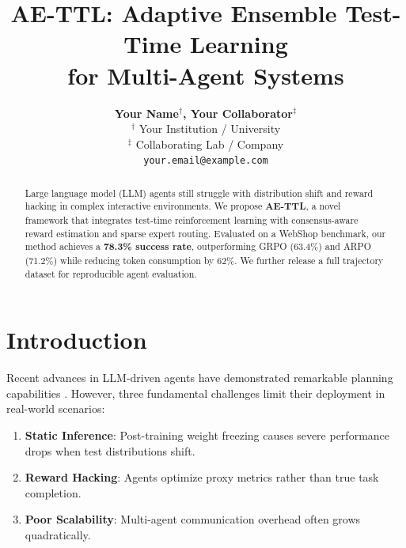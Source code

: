 \documentclass[10pt,twocolumn,letterpaper]{article}
\begin{document}
\title{\textbf{AE-TTL: Adaptive Ensemble Test-Time Learning \\ for Multi-Agent Systems}}

\author{
  \textbf{Your Name$^\dagger$, Your Collaborator$^\ddagger$} \\
  $^\dagger$ Your Institution / University \\
  $^\ddagger$ Collaborating Lab / Company \\
  \texttt{your.email@example.com}
}

\date{}
\maketitle

\begin{abstract}
Large language model (LLM) agents still struggle with distribution shift and reward hacking in complex interactive environments. We propose \textbf{AE-TTL}, a novel framework that integrates test-time reinforcement learning with consensus-aware reward estimation and sparse expert routing. Evaluated on a WebShop benchmark, our method achieves a \textbf{78.3\% success rate}, outperforming GRPO (63.4\%) and ARPO (71.2\%) while reducing token consumption by 62\%. We further release a full trajectory dataset for reproducible agent evaluation.
\end{abstract}

\section{Introduction}
Recent advances in LLM-driven agents have demonstrated remarkable planning capabilities \cite{yao2023react, wu2023autogen}. However, three fundamental challenges limit their deployment in real-world scenarios:
\begin{enumerate}
    \item \textbf{Static Inference}: Post-training weight freezing causes severe performance drops when test distributions shift.
    \item \textbf{Reward Hacking}: Agents optimize proxy metrics rather than true task completion.
    \item \textbf{Poor Scalability}: Multi-agent communication overhead often grows quadratically.
\end{enumerate}
\end{document}

